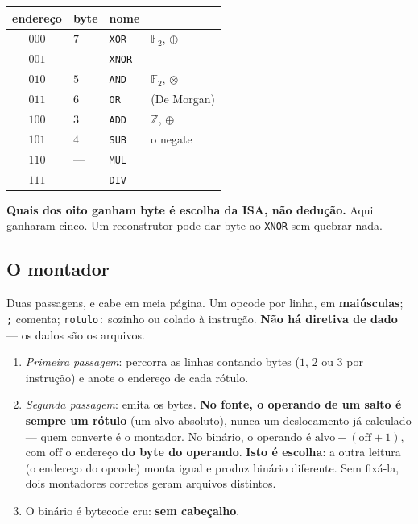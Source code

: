 \documentclass[11pt]{article}
\newcommand{\code}[1]{\texttt{\small #1}}
\theoremstyle{plain}
\theoremstyle{remark}
\begin{document}
\begin{center}
\begin{tabular}{@{}clll@{}}
\toprule
endereço & byte & nome & \\
\midrule
$000$ & $7$ & \code{XOR} & $\mathbb{F}_2$, $\oplus$ \\
$001$ & --- & \code{XNOR} & \\
$010$ & $5$ & \code{AND} & $\mathbb{F}_2$, $\otimes$ \\
$011$ & $6$ & \code{OR} & (De Morgan) \\
$100$ & $3$ & \code{ADD} & $\mathbb{Z}$, $\oplus$ \\
$101$ & $4$ & \code{SUB} & o negate \\
$110$ & --- & \code{MUL} & \\
$111$ & --- & \code{DIV} & \\
\bottomrule
\end{tabular}
\end{center}

\noindent \textbf{Quais dos oito ganham byte é escolha da ISA, não dedução.}
Aqui ganharam cinco. Um reconstrutor pode dar byte ao \code{XNOR} sem quebrar
nada.

\subsection{O montador}

Duas passagens, e cabe em meia página. Um opcode por linha, em \textbf{maiúsculas}; \code{;} comenta;
\code{rotulo:} sozinho ou colado à instrução. \textbf{Não há diretiva de
dado} --- os dados são os arquivos.

\begin{enumerate}
\item \emph{Primeira passagem}: percorra as linhas contando bytes ($1$, $2$ ou
$3$ por instrução) e anote o endereço de cada rótulo.
\item \emph{Segunda passagem}: emita os bytes. \textbf{No fonte, o operando de
um salto é sempre um rótulo} (um alvo absoluto), nunca um deslocamento já
calculado --- quem converte é o montador. No binário, o operando é
$\text{alvo}-(\text{off}+1)$, com $\text{off}$ o endereço \textbf{do byte do
operando}. \textbf{Isto é escolha}: a outra leitura (o endereço do opcode)
monta igual e produz binário diferente. Sem fixá-la, dois montadores corretos
geram arquivos distintos.
\item O binário é bytecode cru: \textbf{sem cabeçalho}.
\end{enumerate}
\end{document}
